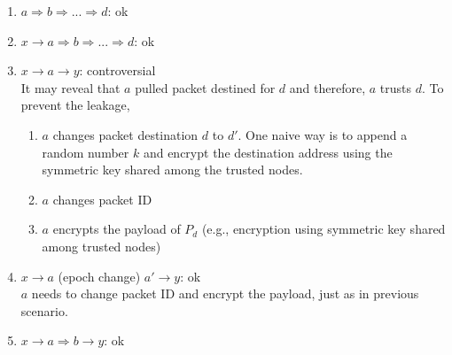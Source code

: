 \documentclass[11pt]{article}
\begin{document}
\begin{enumerate}
\item $a \Rightarrow b \Rightarrow ... \Rightarrow d$: ok

\item $x \rightarrow a \Rightarrow b \Rightarrow ... \Rightarrow d$: ok

\item $x \rightarrow a	\rightarrow y$: controversial	\\
It may reveal that $a$ pulled packet destined for $d$ and therefore, $a$ trusts $d$. 
To prevent the leakage,
 \begin{enumerate}
 \item $a$ changes packet destination $d$ to $d'$.  One naive way is to append a random number $k$ and encrypt the destination address using the symmetric key shared among the trusted nodes.
 \item $a$ changes packet ID
 \item $a$ encrypts the payload of $P_d$ (e.g., encryption using symmetric key shared among trusted nodes) 
 \end{enumerate}


\item $x \rightarrow a$ (epoch change) $a' \rightarrow y$: ok \\
$a$ needs to change packet ID and encrypt the payload, just as in previous scenario.

\item $x \rightarrow a \Rightarrow b \rightarrow y$: ok	\\




\end{enumerate}
\end{document}
